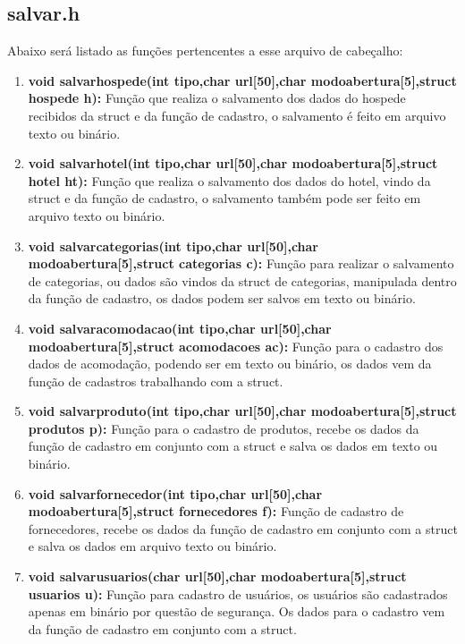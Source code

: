 \documentclass{article}
\begin{document}
\subsection{salvar.h}
	Abaixo será listado as funções pertencentes a esse arquivo de cabeçalho:\\
	\begin{enumerate}
		\item \textbf{void salvarhospede(int tipo,char url[50],char modoabertura[5],struct hospede h): }Função que realiza o salvamento dos dados do hospede recibidos da struct e da função de cadastro, o salvamento é feito em arquivo texto ou binário.\\
		\item \textbf{void salvarhotel(int tipo,char url[50],char modoabertura[5],struct hotel ht): }Função que realiza o salvamento dos dados do hotel, vindo da struct e da função de cadastro, o salvamento também pode ser feito em arquivo texto ou binário.\\
		\item \textbf{void salvarcategorias(int tipo,char url[50],char modoabertura[5],struct categorias c): }Função para realizar o salvamento de categorias, ou dados são vindos da struct de categorias, manipulada dentro da função de cadastro, os dados podem ser salvos em texto ou binário.\\
		\item \textbf{void salvaracomodacao(int tipo,char url[50],char modoabertura[5],struct acomodacoes ac): }Função para o cadastro dos dados de acomodação, podendo ser em texto ou binário, os dados vem da função de cadastros trabalhando com a struct.\\
		\item \textbf{void salvarproduto(int tipo,char url[50],char modoabertura[5],struct produtos p): }Função para o cadastro de produtos, recebe os dados da função de cadastro em conjunto com a struct e salva os dados em texto ou binário.\\
		\item \textbf{void salvarfornecedor(int tipo,char url[50],char modoabertura[5],struct fornecedores f): }Função de cadastro de fornecedores, recebe os dados da função de cadastro em conjunto com a struct e salva os dados em arquivo texto ou binário.\\
		\item \textbf{void salvarusuarios(char url[50],char modoabertura[5],struct usuarios u): }Função para cadastro de usuários, os usuários são cadastrados apenas em binário por questão de segurança. Os dados para o cadastro vem da função de cadastro em conjunto com a struct.\\
	\end{enumerate}
\end{document}
